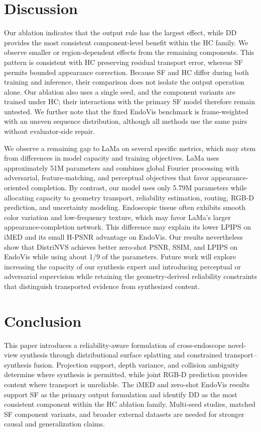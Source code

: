\documentclass[letterpaper,10pt,conference]{ieeeconf}
\begin{document}
\section{Discussion}
\label{sec:discussion}

Our ablation indicates that the output rule has the largest effect, while DD
provides the most consistent component-level benefit within the HC family.
We observe smaller or region-dependent effects from the remaining components.
This pattern is consistent with HC preserving residual transport error, whereas
SF permits bounded appearance correction. Because SF and HC differ during both
training and inference, their comparison does not isolate the output operation
alone. Our ablation also uses a single seed, and the component variants are
trained under HC; their interactions with the primary SF model therefore remain
untested. We further note that the fixed EndoVis benchmark is frame-weighted
with an uneven sequence distribution, although all methods use the same pairs
without evaluator-side repair.

We observe a remaining gap to LaMa on several specific metrics, which may stem
from differences in model capacity and training objectives. LaMa uses
approximately 51M parameters and combines global Fourier processing with
adversarial, feature-matching, and perceptual objectives that favor
appearance-oriented completion. By contrast, our model uses only 5.79M
parameters while allocating capacity to geometry transport, reliability
estimation, routing, RGB-D prediction, and uncertainty modeling. Endoscopic
tissue often exhibits smooth color variation and low-frequency texture, which
may favor LaMa's larger appearance-completion network. This difference may
explain its lower LPIPS on iMED and its small H-PSNR advantage on EndoVis.
Our results nevertheless show that DistriNVS achieves better zero-shot PSNR,
SSIM, and LPIPS on EndoVis while using about 1/9 of the parameters.
Future work will explore increasing the capacity of our synthesis expert and 
introducing perceptual or adversarial supervision
while retaining the geometry-derived
reliability constraints that distinguish transported evidence from synthesized
content.

\section{Conclusion}
\label{sec:conclusion}

This paper introduces a reliability-aware formulation of cross-endoscope
novel-view synthesis through distributional surface splatting and constrained
transport--synthesis fusion. Projection support, depth variance, and collision
ambiguity determine where synthesis is permitted, while joint RGB-D prediction
provides content where transport is unreliable. The iMED and zero-shot EndoVis
results support SF as the primary output formulation and identify DD as the
most consistent component within the HC ablation family. Multi-seed studies,
matched SF component variants, and broader external datasets are needed for
stronger causal and generalization claims.



\end{document}
